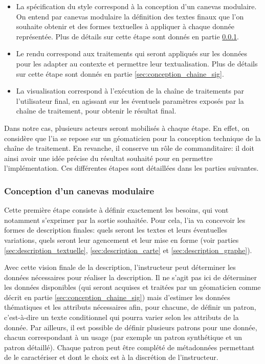 \begin{itemize}
    \item La spécification du style correspond à la conception d'un canevas modulaire. On entend par canevas modulaire la définition des textes finaux que l'on souhaite obtenir et des formes textuelles à appliquer à chaque donnée représentée. Plus de détails sur cette étape sont donnés en partie \ref{sec:conception_canevas}.
    \item Le rendu correspond aux traitements qui seront appliqués sur les données pour les adapter au contexte et permettre leur textualisation. Plus de détails sur cette étape sont donnés en partie \ref{sec:conception_chaine_sig}.
    \item La visualisation correspond à l’exécution de la chaîne de traitements par l'utilisateur final, en agissant sur les éventuels paramètres exposés par la chaîne de traitement,  pour obtenir le résultat final.
\end{itemize}

Dans notre cas, plusieurs acteurs seront mobilisés à chaque étape. En effet, on considère que l’\gls{ia} se repose sur un géomaticien pour la conception technique de la chaîne de traitement. En revanche, il conserve un rôle de commanditaire: il doit ainsi avoir une idée précise du résultat souhaité pour en permettre l’implémentation. Ces différentes étapes sont détaillées dans les parties suivantes.

\subsubsection{Conception d'un canevas modulaire}

\label{sec:conception_canevas}

Cette première étape consiste à définir exactement les besoins, qui vont notamment s’exprimer par la sortie souhaitée. Pour cela, l’\gls{ia} va concevoir les formes de description finales: quels seront les textes et leurs éventuelles variations, quels seront leur agencement et leur mise en forme (voir parties \ref{sec:description_textuelle}, \ref{sec:description_carte} et \ref{sec:description_graphe}).

\newpar{}

Avec cette vision finale de la description, l’instructeur peut déterminer les données nécessaires pour réaliser la description. Il ne s’agit pas ici de déterminer les données disponibles (qui seront acquises et traitées par un géomaticien comme décrit en partie \ref{sec:conception_chaine_sig}) mais d’estimer les données thématiques et les attributs nécessaires afin, pour chacune, de définir un patron, c’est-à-dire un texte conditionnel qui pourra varier selon les attributs de la donnée. Par ailleurs, il est possible de définir plusieurs patrons pour une donnée, chacun correspondant à un usage (par exemple un patron synthétique et un patron détaillé). Chaque patron peut être complété de métadonnées permettant de le caractériser et dont le choix est à la discrétion de l’instructeur.

